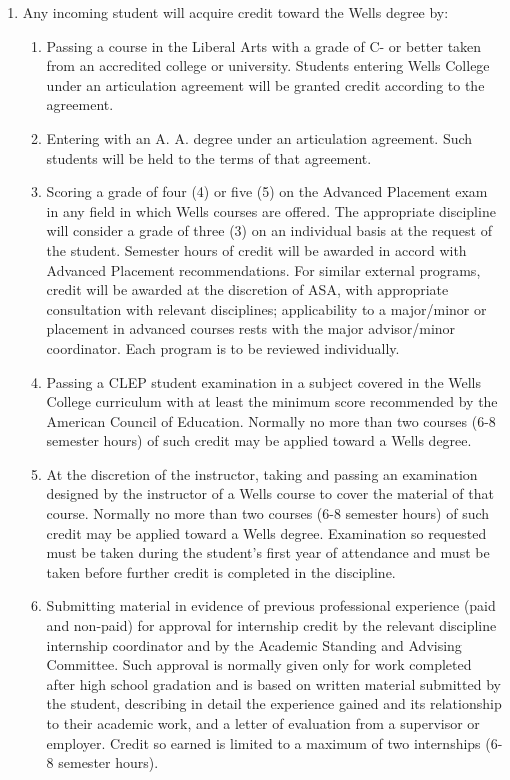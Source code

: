 \documentclass{manual}
\newcommand{\modified}[1]{}
\newcommand{\itemLevelA}{\alph*.}
\newcommand{\itemLevelB}{\arabic*)}
\newcommand{\itemRefA}{\alph*}
\newcommand{\itemRefB}{\arabic*}
\begin{document}
\begin{enumerate}[label=\itemLevelA,ref=\itemRefA]
\item \label{iitem:incomingCredit} Any incoming student will acquire credit toward the Wells degree by:

\begin{enumerate}[label=\itemLevelB,ref=\itemRefB]
\item \label{iitem:passing} Passing \modified{9/14/99} a course in the Liberal Arts with a grade of C- or better taken from an accredited college or university. Students entering Wells College under an articulation agreement will be granted credit according to the agreement. 
\item \label{iitem:articulation} Entering with an A. A. degree under an articulation agreement. Such students will be held to the terms of that agreement.
\item \label{iitem:ap} Scoring a grade of four (4) or five (5) on the Advanced Placement exam in any field in which Wells courses are offered. The appropriate discipline will consider a grade of three (3) on an individual basis at the request of the student. Semester hours of credit will be awarded in accord with Advanced Placement recommendations. For similar external\modified{11/14/95} programs, credit will be awarded at the discretion of ASA, with appropriate consultation with relevant disciplines; applicability to a major/minor or placement in advanced courses rests with the major advisor/minor coordinator. Each program is to be reviewed individually.
\item \label{iitem:clep} Passing a CLEP student examination in a subject covered in the Wells College curriculum with at least the minimum score recommended by the American Council of Education. Normally no more than two courses (6-8 semester hours) of such credit may be applied toward a Wells degree.
\item \label{iitem:placement} At the discretion \modified{5/8/90}of the instructor, taking and passing an examination designed by the instructor of a Wells course to cover the material of that course. Normally no more than two courses (6-8 semester hours) of such credit may be applied toward a Wells degree. Examination so requested must be taken during the student's first year of attendance and must be taken before further credit is completed in the discipline.
\item \label{iitem:professional} Submitting material \modified{5/13/93} in evidence of previous professional experience (paid and non-paid) for approval for internship credit by the relevant discipline internship coordinator and by the Academic Standing and Advising Committee. Such approval is normally given only for work completed after high school gradation and is based on written material submitted by the student, describing in detail the experience gained and its relationship to their academic work, and a letter of evaluation from a supervisor or employer. Credit so earned is limited to a maximum of two internships (6-8 semester hours).

\end{enumerate}
\end{enumerate}
\end{document}
